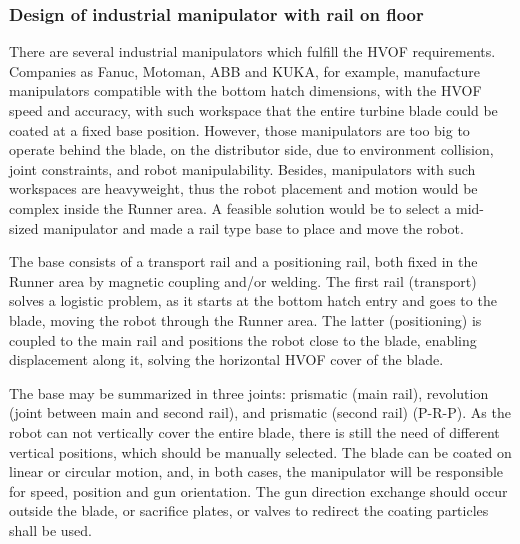 \subsubsection{Design of industrial manipulator with rail on
floor}\label{proj_manip}

There are several industrial manipulators which fulfill the HVOF requirements.
Companies as Fanuc, Motoman, ABB and KUKA, for example, manufacture manipulators
compatible with the bottom hatch dimensions, with the HVOF speed and accuracy,
with such workspace that the entire turbine blade could be coated at a fixed
base position. However, those manipulators are too big to operate behind the
blade, on the distributor side, due to environment collision, joint
constraints, and robot manipulability. Besides, manipulators with such
workspaces are heavyweight, thus the robot placement and motion would be complex
inside the Runner area. A feasible solution would be to select a
mid-sized manipulator and made a rail type base to place and move the robot.


The base consists of a transport rail and a positioning rail, both fixed
in the Runner area by magnetic coupling and/or welding. The first rail
(transport) solves a logistic problem, as it starts at the bottom hatch entry
and goes to the blade, moving the robot through the Runner area. The latter
(positioning) is coupled to the main rail and positions the robot close to the
blade, enabling displacement along it, solving the horizontal HVOF cover of the
blade.

The base may be summarized in three joints: prismatic (main rail), revolution
(joint between main and second rail), and prismatic (second rail) (P-R-P). As
the robot can not vertically cover the entire blade, there is still the need of
different vertical positions, which should be manually selected. The blade can
be coated on linear or circular motion, and, in both cases, the manipulator will
be responsible for speed, position and gun orientation. The gun direction
exchange should occur outside the blade, or sacrifice plates, or valves to
redirect the coating particles shall be used.

